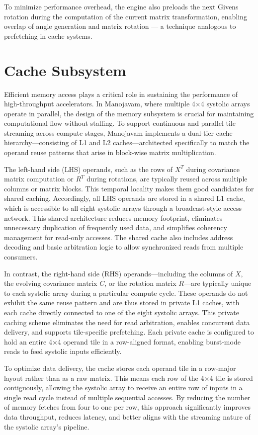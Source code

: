 To minimize performance overhead, the engine also preloads the next Givens rotation during the computation of the current matrix transformation, enabling overlap of angle generation and matrix rotation — a technique analogous to prefetching in cache systems.

\section{Cache Subsystem}
Efficient memory access plays a critical role in sustaining the performance of high-throughput accelerators. In Manojavam, where multiple 4×4 systolic arrays operate in parallel, the design of the memory subsystem is crucial for maintaining computational flow without stalling. To support continuous and parallel tile streaming across compute stages, Manojavam implements a dual-tier cache hierarchy—consisting of L1 and L2 caches—architected specifically to match the operand reuse patterns that arise in block-wise matrix multiplication.

The left-hand side (LHS) operands, such as the rows of $X^{T}$ during covariance matrix computation or $R^{T}$ during rotations, are typically reused across multiple columns or matrix blocks. This temporal locality makes them good candidates for shared caching. Accordingly, all LHS operands are stored in a shared L1 cache, which is accessible to all eight systolic arrays through a broadcast-style access network. This shared architecture reduces memory footprint, eliminates unnecessary duplication of frequently used data, and simplifies coherency management for read-only accesses. The shared cache also includes address decoding and basic arbitration logic to allow synchronized reads from multiple consumers.

In contrast, the right-hand side (RHS) operands—including the columns of $X$, the evolving covariance matrix $C$, or the rotation matrix $R$—are typically unique to each systolic array during a particular compute cycle. These operands do not exhibit the same reuse pattern and are thus stored in private L1 caches, with each cache directly connected to one of the eight systolic arrays. This private caching scheme eliminates the need for read arbitration, enables concurrent data delivery, and supports tile-specific prefetching. Each private cache is configured to hold an entire 4×4 operand tile in a row-aligned format, enabling burst-mode reads to feed systolic inputs efficiently.

To optimize data delivery, the cache stores each operand tile in a row-major layout rather than as a raw matrix. This means each row of the 4×4 tile is stored contiguously, allowing the systolic array to receive an entire row of inputs in a single read cycle instead of multiple sequential accesses. By reducing the number of memory fetches from four to one per row, this approach significantly improves data throughput, reduces latency, and better aligns with the streaming nature of the systolic array’s pipeline.

